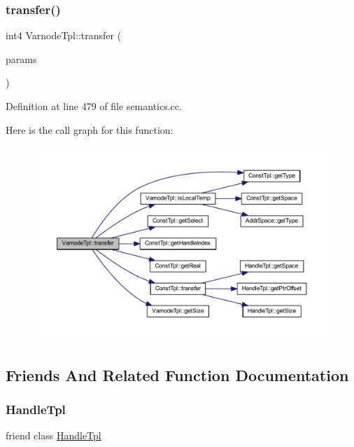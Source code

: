 \subsubsection{\texorpdfstring{transfer()}{transfer()}}
{\footnotesize\ttfamily int4 Varnode\+Tpl\+::transfer (\begin{DoxyParamCaption}\item[{const vector$<$ \mbox{\hyperlink{class_handle_tpl}{Handle\+Tpl}} $\ast$ $>$ \&}]{params }\end{DoxyParamCaption})}



Definition at line 479 of file semantics.\+cc.

Here is the call graph for this function\+:
\nopagebreak
\begin{figure}[H]
\begin{center}
\leavevmode
\includegraphics[width=350pt]{class_varnode_tpl_a693d67734f6eb8c72419db6c7e977b6e_cgraph}
\end{center}
\end{figure}


\subsection{Friends And Related Function Documentation}
\mbox{\label{class_varnode_tpl_a47ccc5db4f81caa67fccdc5c8ee95d56}} 
\subsubsection{\texorpdfstring{HandleTpl}{HandleTpl}}
{\footnotesize\ttfamily friend class \mbox{\hyperlink{class_handle_tpl}{Handle\+Tpl}}\hspace{0.3cm}{\ttfamily [friend]}}



